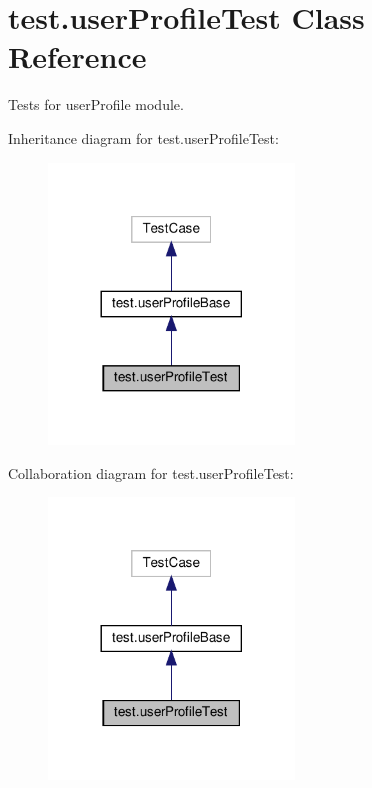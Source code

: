 \hypertarget{classtest_1_1userProfileTest}{}\section{test.\+user\+Profile\+Test Class Reference}
\label{classtest_1_1userProfileTest}


Tests for user\+Profile module.  




Inheritance diagram for test.\+user\+Profile\+Test\+:
\nopagebreak
\begin{figure}[H]
\begin{center}
\leavevmode
\includegraphics[width=185pt]{classtest_1_1userProfileTest__inherit__graph}
\end{center}
\end{figure}


Collaboration diagram for test.\+user\+Profile\+Test\+:
\nopagebreak
\begin{figure}[H]
\begin{center}
\leavevmode
\includegraphics[width=185pt]{classtest_1_1userProfileTest__coll__graph}
\end{center}
\end{figure}
